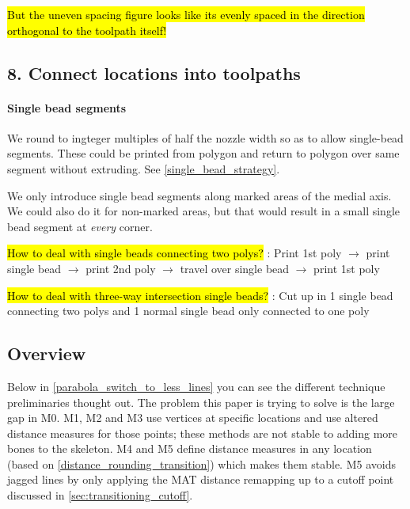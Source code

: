 \hl{But the uneven spacing figure looks like its evenly spaced in the direction orthogonal to the toolpath itself!}






\subsection{8. Connect locations into toolpaths}
\paragraph{Single bead segments}
We round to ingteger multiples of half the nozzle width so as to allow single-bead segments.
These could be printed from polygon and return to polygon over same segment without extruding.
See \cref{single_bead_strategy}.

We only introduce single bead segments along marked areas of the medial axis.
We could also do it for non-marked areas, but that would result in a small single bead segment at \emph{every} corner.


\hl{How to deal with single beads connecting two polys?}
: Print 1st poly $\to$ print single bead $\to$ print 2nd poly $\to$ travel over single bead $\to$ print 1st poly

\hl{How to deal with three-way intersection single beads?}
: Cut up in 1 single bead connecting two polys and 1 normal single bead only connected to one poly






\subsection{Overview}
Below in \cref{parabola_switch_to_less_lines} you can see the different technique preliminaries thought out.
The problem this paper is trying to solve is the large gap in M0.
M1, M2 and M3 use vertices at specific locations and use altered distance measures for those points; these methods are not stable to adding more bones to the skeleton.
M4 and M5 define distance measures in any location (based on \cref{distance_rounding_transition}) which makes them stable.
M5 avoids jagged lines by only applying the MAT distance remapping up to a cutoff point discussed in \cref{sec:transitioning_cutoff}.


